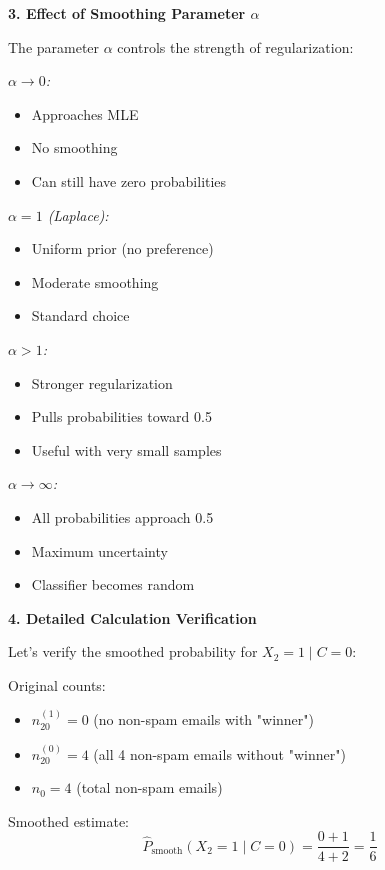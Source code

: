 \documentclass[12pt]{article}
\begin{document}
\begin{explanation}
\textbf{3. Effect of Smoothing Parameter $\alpha$}

The parameter $\alpha$ controls the strength of regularization:

\textit{$\alpha \to 0$:}
\begin{itemize}
    \item Approaches MLE
    \item No smoothing
    \item Can still have zero probabilities
\end{itemize}

\textit{$\alpha = 1$ (Laplace):}
\begin{itemize}
    \item Uniform prior (no preference)
    \item Moderate smoothing
    \item Standard choice
\end{itemize}

\textit{$\alpha > 1$:}
\begin{itemize}
    \item Stronger regularization
    \item Pulls probabilities toward 0.5
    \item Useful with very small samples
\end{itemize}

\textit{$\alpha \to \infty$:}
\begin{itemize}
    \item All probabilities approach 0.5
    \item Maximum uncertainty
    \item Classifier becomes random
\end{itemize}

\textbf{4. Detailed Calculation Verification}

Let's verify the smoothed probability for $X_2 = 1 \mid C = 0$:

Original counts:
\begin{itemize}
    \item $n_{20}^{(1)} = 0$ (no non-spam emails with "winner")
    \item $n_{20}^{(0)} = 4$ (all 4 non-spam emails without "winner")
    \item $n_0 = 4$ (total non-spam emails)
\end{itemize}

Smoothed estimate:
\[
\hat{P}_{\text{smooth}}(X_2 = 1 \mid C = 0) = \frac{0 + 1}{4 + 2} = \frac{1}{6}
\]


\end{explanation}
\end{document}
